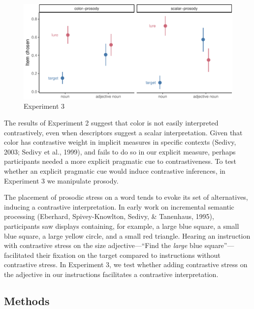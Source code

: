 \documentclass[10pt, letterpaper]{article}
\newenvironment{CodeChunk}{}{}
\begin{document}
\begin{CodeChunk}
\begin{figure}[tb]

{\centering \includegraphics{figs/e3_fig-1} 

}

\caption[Experiment 3]{Experiment 3}\label{fig:e3_fig}
\end{figure}
\end{CodeChunk}

The results of Experiment 2 suggest that color is not easily interpreted
contrastively, even when descriptors suggest a scalar interpretation.
Given that color has contrastive weight in implicit measures in specific
contexts (Sedivy, 2003; Sedivy et al., 1999), and fails to do so in our
explicit measure, perhaps participants needed a more explicit pragmatic
cue to contrastiveness. To test whether an explicit pragmatic cue would
induce contrastive inferences, in Experiment 3 we manipulate prosody.

The placement of prosodic stress on a word tends to evoke its set of
alternatives, inducing a contrastive interpretation. In early work on
incremental semantic processing (Eberhard, Spivey-Knowlton, Sedivy, \&
Tanenhaus, 1995), participants saw displays containing, for example, a
large blue square, a small blue square, a large yellow circle, and a
small red triangle. Hearing an instruction with contrastive stress on
the size adjective---``Find the \emph{large} blue square''---facilitated
their fixation on the target compared to instructions without
contrastive stress. In Experiment 3, we test whether adding contrastive
stress on the adjective in our instructions facilitates a contrastive
interpretation.

\subsection{Methods}\label{methods-1}
\end{document}
